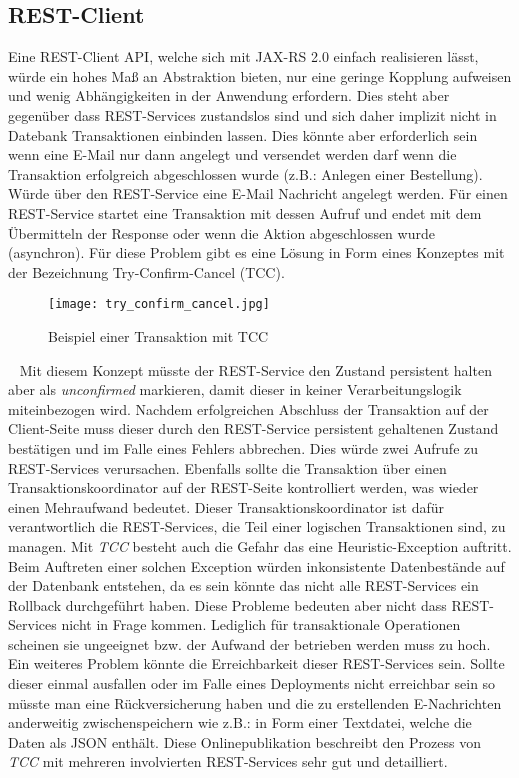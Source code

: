 \subsection{REST-Client}
Eine REST-Client API, welche sich mit JAX-RS 2.0 einfach realisieren lässt, würde ein hohes Maß an Abstraktion bieten, nur eine geringe Kopplung aufweisen und wenig Abhängigkeiten in der Anwendung erfordern. Dies steht aber gegenüber dass REST-Services zustandslos sind und sich daher implizit nicht in Datebank 
Transaktionen einbinden lassen. Dies könnte aber erforderlich sein wenn eine E-Mail nur dann angelegt und versendet werden darf wenn die Transaktion erfolgreich abgeschlossen wurde (z.B.: Anlegen einer Bestellung). Würde über den REST-Service eine E-Mail Nachricht angelegt werden. Für einen REST-Service startet eine Transaktion mit dessen Aufruf und endet mit dem Übermitteln der Response oder wenn die Aktion abgeschlossen wurde (asynchron).
\newpage
Für diese Problem gibt es eine Lösung in Form eines Konzeptes mit der Bezeichnung Try-Confirm-Cancel (TCC).
\begin{figure}[h]
\centering
\texttt{[image: try\_confirm\_cancel.jpg]} %
\caption{Beispiel einer Transaktion mit TCC}
\label{fig:clevermail-rest-tcc}
\end{figure}
\ \newline
Mit diesem Konzept müsste der REST-Service den Zustand persistent halten aber als \emph{unconfirmed} markieren, damit dieser in keiner Verarbeitungslogik miteinbezogen wird. Nachdem erfolgreichen Abschluss der Transaktion auf der Client-Seite muss dieser durch den REST-Service persistent gehaltenen Zustand bestätigen und im Falle eines Fehlers abbrechen. Dies würde zwei Aufrufe zu REST-Services verursachen. Ebenfalls sollte die Transaktion über einen Transaktionskoordinator auf der REST-Seite kontrolliert werden, was wieder einen Mehraufwand bedeutet. Dieser Transaktionskoordinator ist dafür verantwortlich die REST-Services, die Teil einer logischen Transaktionen sind,  zu managen. Mit \emph{TCC} besteht auch die Gefahr das eine Heuristic-Exception auftritt. Beim Auftreten einer solchen Exception würden inkonsistente Datenbestände auf der Datenbank entstehen, da es sein könnte das nicht alle REST-Services ein Rollback durchgeführt haben.
\newline
\newline
Diese Probleme bedeuten aber nicht dass REST-Services nicht in Frage kommen. Lediglich für transaktionale Operationen scheinen sie ungeeignet bzw. der Aufwand der betrieben werden muss zu hoch. Ein weiteres Problem könnte die Erreichbarkeit dieser REST-Services sein. Sollte dieser einmal ausfallen oder im Falle eines Deployments nicht erreichbar sein so müsste man eine Rückversicherung haben und die zu erstellenden E-Nachrichten anderweitig zwischenspeichern wie z.B.: in Form einer Textdatei, welche die Daten als JSON enthält.
\newline
\newline
Diese Onlinepublikation \cite{atomikosTcc} beschreibt den Prozess von \emph{TCC} mit mehreren involvierten REST-Services sehr gut und detailliert.
